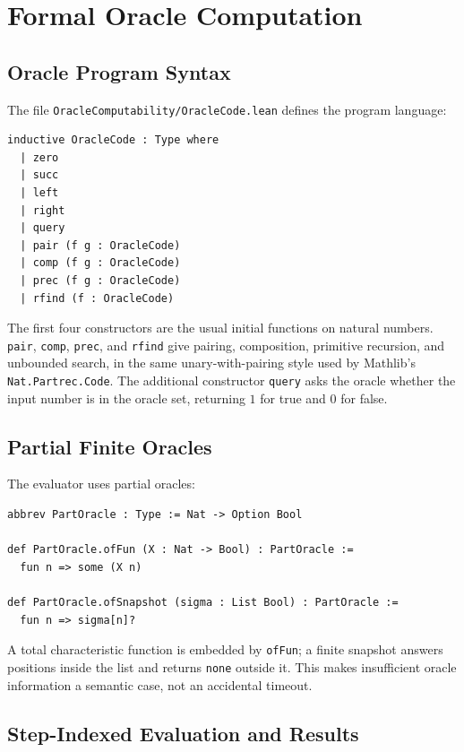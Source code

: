 \section{Formal Oracle Computation}

\subsection{Oracle Program Syntax}

The file \texttt{OracleComputability/OracleCode.lean} defines the program language:

\begin{lstlisting}
inductive OracleCode : Type where
  | zero
  | succ
  | left
  | right
  | query
  | pair (f g : OracleCode)
  | comp (f g : OracleCode)
  | prec (f g : OracleCode)
  | rfind (f : OracleCode)
\end{lstlisting}

The first four constructors are the usual initial functions on natural
numbers.  \texttt{pair}, \texttt{comp}, \texttt{prec}, and \texttt{rfind}
give pairing, composition, primitive recursion, and unbounded search, in
the same unary-with-pairing style used by Mathlib's
\texttt{Nat.Partrec.Code}.  The additional constructor \texttt{query}
asks the oracle whether the input number is in the oracle set, returning
\(1\) for true and \(0\) for false.

\subsection{Partial Finite Oracles}

The evaluator uses partial oracles:

\begin{lstlisting}
abbrev PartOracle : Type := Nat -> Option Bool

def PartOracle.ofFun (X : Nat -> Bool) : PartOracle :=
  fun n => some (X n)

def PartOracle.ofSnapshot (sigma : List Bool) : PartOracle :=
  fun n => sigma[n]?
\end{lstlisting}

A total characteristic function is embedded by \texttt{ofFun}; a finite
snapshot answers positions inside the list and returns \texttt{none}
outside it.  This makes insufficient oracle information a semantic case,
not an accidental timeout.

\subsection{Step-Indexed Evaluation and Results}

